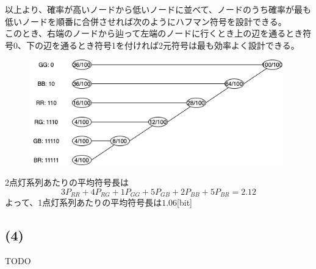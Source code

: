 \documentclass[a4paper,12pt,xelatex,ja=standard]{bxjsarticle}
\begin{document}
以上より、確率が高いノードから低いノードに並べて、ノードのうち確率が最も低いノードを順番に合併させれば次のようにハフマン符号を設計できる。\\
このとき、右端のノードから辿って左端のノードに行くとき上の辺を通るとき符号0、下の辺を通るとき符号1を付ければ2元符号は最も効率よく設計できる。\\

\begin{figure}[H]
  \centering
  \includegraphics[width=11cm]{images/huffman_tree2013.png}
\end{figure}

2点灯系列あたりの平均符号長は
\[
  3P_{RR} + 4P_{RG} + 1P_{GG} + 5P_{GB} + 2P_{BB} + 5P_{BR} = 2.12
\]
よって、1点灯系列あたりの平均符号長は$1.06$[bit]

\subsection*{(4)}
TODO
\end{document}
